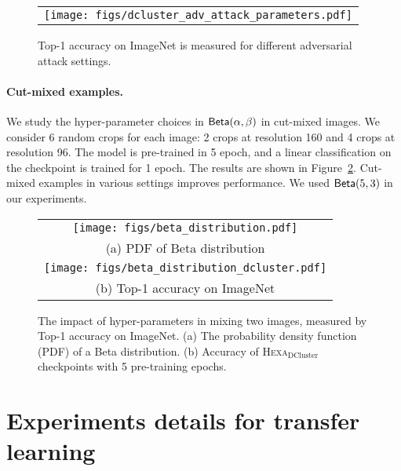 \documentclass[10pt,twocolumn,letterpaper]{article}
\newcommand{\shortname}{\textsc{Hexa}}
\begin{document}
\begin{figure}[h!]\vspace{-0mm}\centering
	\begin{tabular}{c}
	    \hspace{-4mm}		
		\texttt{[image: figs/dcluster\_adv\_attack\_parameters.pdf]}
	\end{tabular}
	\vspace{-2mm}
	\caption{Top-1 accuracy on ImageNet is measured for different adversarial attack settings.}
	\vspace{-2mm}
	\label{fig:adv_example_ablation}
\end{figure}


\paragraph{Cut-mixed examples.}
We study the hyper-parameter choices in $\textsf{Beta}(\alpha, \beta)$ in cut-mixed images. We consider 6 random crops for each image: 2 crops at resolution 160 and 4 crops at resolution 96. The model is pre-trained in 5 epoch, and a linear classification on the checkpoint is trained for 1 epoch. The results are shown in Figure~\ref{fig:cutmix_example_ablation}. Cut-mixed examples in various settings improves performance. We used  $\textsf{Beta}(5, 3)$ in our experiments.

\begin{figure}[h!]\vspace{-0mm}\centering
	\begin{tabular}{c}
	    \hspace{-4mm}		
		\texttt{[image: figs/beta\_distribution.pdf]} \\
		(a) PDF of Beta distribution \\
	    \texttt{[image: figs/beta\_distribution\_dcluster.pdf]} \\
		(b) Top-1 accuracy on ImageNet
	\end{tabular}
	\vspace{-2mm}
	\caption{The impact of hyper-parameters in mixing two images, measured by Top-1 accuracy on ImageNet. (a) The probability density function (PDF) of a Beta distribution. (b) Accuracy of \shortname{}$_{\text{DCluster}}$ checkpoints with 5 pre-training epochs.}
	\vspace{-2mm}
	\label{fig:cutmix_example_ablation}
\end{figure}


\section{Experiments details for transfer learning}
\end{document}
